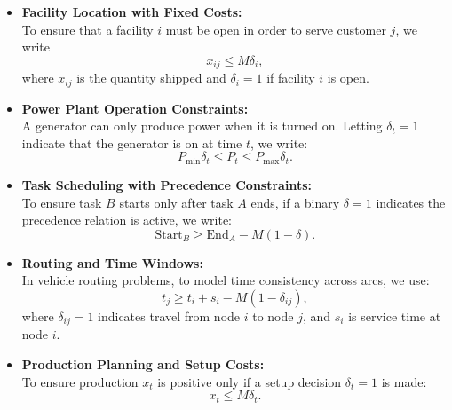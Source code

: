 \begin{itemize}
  \item \textbf{Facility Location with Fixed Costs:}\\
  To ensure that a facility \(i\) must be open in order to serve customer \(j\), we write
  \[
  x_{ij} \le M \delta_i,
  \]
  where \(x_{ij}\) is the quantity shipped and \(\delta_i = 1\) if facility \(i\) is open.


  \item \textbf{Power Plant Operation Constraints:}\\
  A generator can only produce power when it is turned on. Letting \(\delta_t = 1\) indicate that the generator is on at time \(t\), we write:
  \[
  P_{\min} \delta_t \le P_t \le P_{\max} \delta_t.
  \]

  \item \textbf{Task Scheduling with Precedence Constraints:}\\
  To ensure task \(B\) starts only after task \(A\) ends, if a binary \(\delta = 1\) indicates the precedence relation is active, we write:
  \[
  \text{Start}_B \ge \text{End}_A - M(1 - \delta).
  \]

  \item \textbf{Routing and Time Windows:}\\
  In vehicle routing problems, to model time consistency across arcs, we use:
  \[
  t_j \ge t_i + s_i - M(1 - \delta_{ij}),
  \]
  where \(\delta_{ij} = 1\) indicates travel from node \(i\) to node \(j\), and \(s_i\) is service time at node \(i\).

  \item \textbf{Production Planning and Setup Costs:}\\
  To ensure production \(x_t\) is positive only if a setup decision \(\delta_t = 1\) is made:
  \[
  x_t \le M \delta_t.
  \]
\end{itemize}
\newpage
